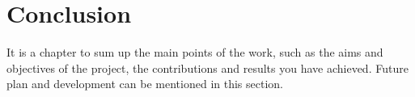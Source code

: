 \section{Conclusion}
 It is a chapter to sum up the main points of the work, such as the aims and objectives of the project, the contributions and results you have achieved.  Future plan and development can be mentioned in this section.